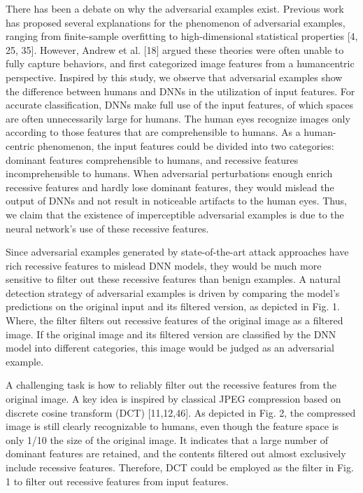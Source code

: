 \documentclass{article}
\begin{document}
There has been a debate on why the adversarial examples exist. Previous work has proposed several explanations for the phenomenon of adversarial examples, ranging from finite-sample overfitting to high-dimensional statistical properties [4, 25, 35]. However, Andrew et al. [18] argued these theories were often unable to fully capture behaviors, and first categorized image features from a humancentric perspective. Inspired by this study, we observe that adversarial examples show the difference between humans and DNNs in the utilization of input features. For accurate classification, DNNs make full use of the input features, of which spaces are often unnecessarily large for humans. The human eyes recognize images only according to those features that are comprehensible to humans. As a human-centric phenomenon, the input features could be divided into two categories: dominant features comprehensible to humans, and recessive features incomprehensible to humans. When adversarial perturbations enough enrich recessive features and hardly lose dominant features, they would mislead the output of DNNs and not result in noticeable artifacts to the human eyes. Thus, we claim that the existence of imperceptible adversarial examples is due to the neural network's use of these recessive features.

Since adversarial examples generated by state-of-the-art attack approaches have rich recessive features to mislead DNN models, they would be much more sensitive to filter out these recessive features than benign examples. A natural detection strategy of adversarial examples is driven by comparing the model's predictions on the original input and its filtered version, as depicted in Fig. 1. Where, the filter filters out recessive features of the original image as a filtered image. If the original image and its filtered version are classified by the DNN model into different categories, this image would be judged as an adversarial example.

A challenging task is how to reliably filter out the recessive features from the original image. A key idea is inspired by classical JPEG compression based on discrete cosine transform (DCT) [11,12,46]. As depicted in Fig. 2, the compressed image is still clearly recognizable to humans, even though the feature space is only 1/10 the size of the original image. It indicates that a large number of dominant features are retained, and the contents filtered out almost exclusively include recessive features. Therefore, DCT could be employed as the filter in Fig. 1 to filter out recessive features from input features.
\end{document}
